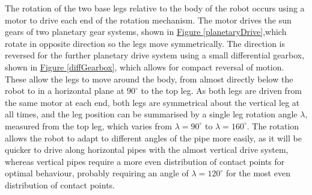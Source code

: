 \documentclass[11pt]{article}		%
\begin{document}
			The rotation of the two base legs relative to the body of the robot occurs using a motor to drive each end of the rotation mechanism.
			The motor drives the sun gears of two planetary gear systems, shown in \hyperref[planetaryDrive]{Figure \ref*{planetaryDrive}},which rotate in opposite direction so the legs move symmetrically.
			The direction is reversed for the further planetary drive system using a small differential gearbox, shown in \hyperref[diffGearbox]{Figure \ref*{diffGearbox}}, which allows for compact reversal of motion.
			These allow the legs to move around the body, from almost directly below the robot to in a horizontal plane at $90^\circ$ to the top leg.
			As both legs are driven from the same motor at each end, both legs are symmetrical about the vertical leg at all times, and the leg position can be summarised by a single leg rotation angle $\lambda$, measured from the top leg, which varies from $\lambda = 90^\circ$ to $\lambda = 160^\circ$.
			The rotation allows the robot to adapt to different angles of the pipe more easily, as it will be quicker to drive along horizontal pipes with the almost vertical drive system, whereas vertical pipes require a more even distribution of contact points for optimal behaviour, probably requiring an angle of $\lambda = 120^\circ$ for the most even distribution of contact points.
									
\end{document}
